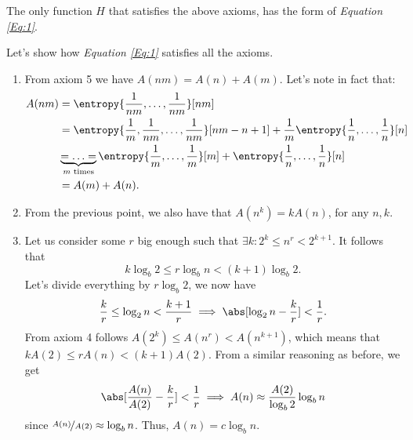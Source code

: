 \documentclass{subfiles}
\begin{document}
    \begin{theorem*}
        The only function \(H\) that satisfies the above axioms,
        has the form of \emph{Equation \eqref{Eq:1}}.
    \end{theorem*}
    \begin{proof*}
        Let's show how \emph{Equation \eqref{Eq:1}} satisfies all the axioms.
        \begin{enumerate}
            \item From axiom 5 we have \(A(nm) = A(n) + A(m)\).
                Let's note in fact that: 
                \[\begin{aligned}
                    A(nm) & = \entropy{\frac{1}{nm}, \ldots, \frac{1}{nm}}[nm] \\ 
                        & = \entropy{
                            \frac{1}{m}, \frac{1}{nm}, \ldots, \frac{1}{nm} 
                        }[nm - n + 1] + \frac{1}{m} \entropy{
                            \frac{1}{n}, \ldots, \frac{1}{n}
                        }[n] \\
                        & \underbrace{ = \ldots = }_{m \text{ times}} \entropy{
                            \frac{1}{m}, \ldots, \frac{1}{m}
                        }[m] + \entropy{\frac{1}{n}, \ldots, \frac{1}{n}}[n] \\ 
                    & = A(m) + A(n).
                \end{aligned}\]
            \item From the previous point, 
                we also have that \(A(n^{k}) = k A(n)\), for any \(n, k\).

            \item Let us consider some \(r\) big enough such that 
                \(\exists k : 2^{k} \le n^{r} < 2^{k + 1}\).
                It follows that 
                \[
                    k \log_{b} 2 \le r \log_{b} n < (k + 1) \log_{b} 2.
                \]
                Let's divide everything by \(r \log_{b} 2\), we now have 
                \[
                    \frac{k}{r} \le \log_{2} n < \frac{k + 1}{r} 
                        \implies \abs[\log_{2} n - \frac{k}{r}] < \frac{1}{r}.
                \]
                From axiom 4 follows \(A(2^{k}) \le A(n^{r}) < A(n^{k + 1})\),
                which means that \(k A(2) \le r A(n) < (k + 1)A(2)\).
                From a similar reasoning as before, we get 
                \[
                    \abs[\frac{A(n)}{A(2)} - \frac{k}{r}] < \frac{1}{r}
                        \implies A(n) \approx \frac{A(2)}{\log_{b} 2} \log_{b} n
                \]
                since \(\nicefrac{A(n)}{A(2)} \approx \log_{b} n\).
                Thus, \(A(n) = c \log_{b} n\).


\end{enumerate}
\end{proof*}
\end{document}

